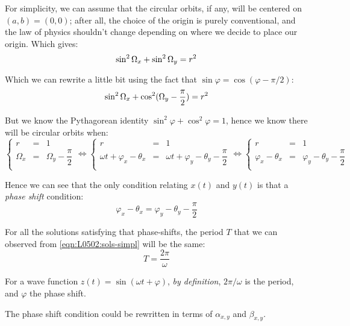 \documentclass[solutions.tex]{subfiles}
\begin{document}
For simplicity, we can assume that the circular orbits, if any, will be centered
on $(a,b)=(0,0)$; after all, the choice of the origin is purely conventional,
and the law of physics shouldn't change depending on where we decide to place
our origin. Which gives:
\[
	\sin^2\Omega_x+\sin^2\Omega_y = r^2 \\
\]

Which we can rewrite a little bit using the fact that
$\sin\varphi = \cos(\varphi-\pi/2)$:
\[
	\sin^2\Omega_x+\cos^2(\Omega_y-\frac{\pi}{2}) = r^2 \\
\]

But we know the Pythagorean identity $\sin^2\varphi+\cos^2\varphi = 1$,
hence we know there will be circular orbits when:
\begin{equation*}
	\left\{
	\begin{array}{lll}
		r &=& 1 \\
		\Omega_x &=& \Omega_y - \dfrac{\pi}{2} \\
	\end{array}
	\right.
	\Leftrightarrow
	\left\{
	\begin{array}{lll}
		r &=& 1 \\
		\omega t + \varphi_x - \theta_x &=& \omega t + \varphi_y -\theta_y - \dfrac{\pi}{2} \\
	\end{array}
	\right.
	\Leftrightarrow
	\left\{
	\begin{array}{lll}
		r &=& 1 \\
		\varphi_x - \theta_x &=& \varphi_y -\theta_y - \dfrac{\pi}{2} \\
	\end{array}
	\right.
\end{equation*}

Hence we can see that the only condition relating $x(t)$ and $y(t)$ is that
a \textit{phase shift} condition:
\[
	\boxed{\varphi_x - \theta_x = \varphi_y -\theta_y - \dfrac{\pi}{2}}
\]

For all the solutions satisfying that phase-shifts, the period $T$ that
we can observed from \eqref{eqn:L0502:sols-simpl} will be the same:
\[
	\boxed{T=\dfrac{2\pi}{\omega}}
\]

\begin{remark} For a wave function $z(t)=\sin(\omega t+\varphi)$,
\textit{by definition}, $2\pi/\omega$ is the period, and $\varphi$
the phase shift.
\end{remark}
\begin{remark} The phase shift condition could be rewritten in terms
of $\alpha_{x,y}$ and $\beta_{x,y}$.
\end{remark}
\end{document}
